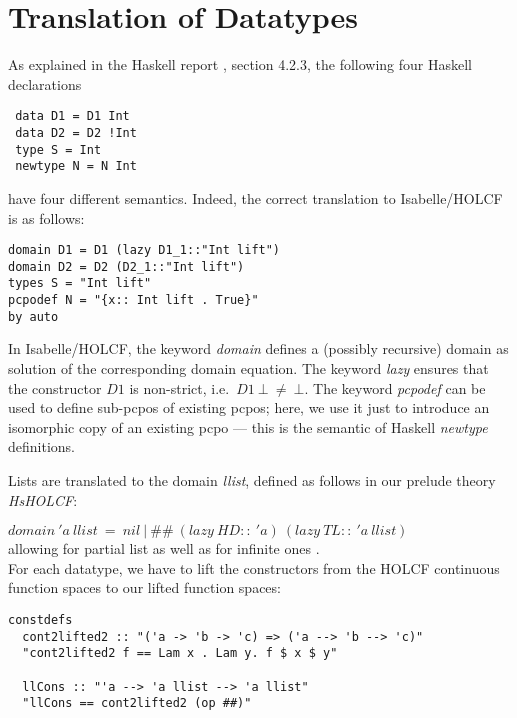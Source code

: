 \documentclass{llncs}
\begin{document}
\section{Translation of Datatypes}

As explained in the Haskell report \cite{HaskellRep}, section 4.2.3,
the following four Haskell declarations

\begin{verbatim}
 data D1 = D1 Int
 data D2 = D2 !Int
 type S = Int
 newtype N = N Int
\end{verbatim}

have four different semantics. Indeed, the correct translation to
Isabelle/HOLCF is as follows:

\begin{verbatim}
domain D1 = D1 (lazy D1_1::"Int lift")
domain D2 = D2 (D2_1::"Int lift")
types S = "Int lift"
pcpodef N = "{x:: Int lift . True}"
by auto
\end{verbatim}
\noindent In Isabelle/HOLCF, the keyword \emph{domain} defines a
(possibly recursive) domain as solution of the corresponding domain
equation.  The keyword \emph{lazy} ensures that the constructor $D1$
is non-strict, i.e.\ $D1 \ \bot \ \neq \ \bot$.  The keyword
\emph{pcpodef} can be used to define sub-pcpos of existing pcpos;
here, we use it just to introduce an isomorphic copy of an existing
pcpo --- this is the semantic of Haskell \emph{newtype} definitions.


Lists are translated to the domain \emph{llist}, defined as follows 
in our prelude theory \emph{HsHOLCF}:

$domain \ 'a\ llist \ = \ nil \ | \ \#\# \ (lazy\ HD :: \ 'a) \ 
(lazy \ TL :: \ 'a \ llist) $\\

\noindent allowing for partial list as well as for infinite ones \cite{holcf}.\\

For each datatype, we have to lift the constructors from the
HOLCF continuous function spaces to our lifted function spaces:

\begin{verbatim}
constdefs
  cont2lifted2 :: "('a -> 'b -> 'c) => ('a --> 'b --> 'c)"
  "cont2lifted2 f == Lam x . Lam y. f $ x $ y"

  llCons :: "'a --> 'a llist --> 'a llist"
  "llCons == cont2lifted2 (op ##)"
\end{verbatim}
\end{document}
